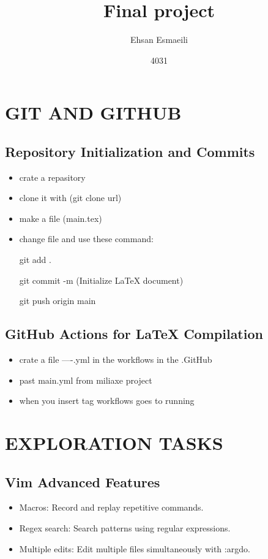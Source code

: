 \documentclass{article}
\title{Final project}
\date{4031}
\author{Ehsan Esmaeili}
\begin{document}
\maketitle
\newpage

\tableofcontents

\newpage

\section{GIT AND GITHUB}

\subsection{Repository Initialization and Commits}
\begin{itemize}
   

 \item crate a repasitory

 \item clone it with (git clone url)

 \item make a file (main.tex)

 \item change file and use these command:

  git add .

  git commit -m (Initialize LaTeX document)

  git push origin main
\end{itemize}
\subsection{GitHub Actions for LaTeX Compilation}

\begin{itemize}

\item crate a file ----.yml in the workflows in the .GitHub

\item past main.yml from miliaxe project

\item when you insert tag workflows goes to running
\end{itemize}
\newpage

\section{EXPLORATION TASKS}

\subsection{Vim Advanced Features}
\begin{itemize}

\item Macros: Record and replay repetitive commands. 

\item Regex search: Search patterns using regular expressions.

\item Multiple edits: Edit multiple files simultaneously with :argdo.
\end{itemize}
\end{document}

